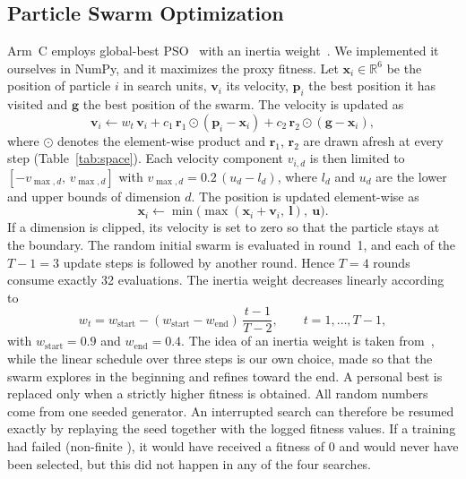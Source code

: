 \subsection{Particle Swarm Optimization}
\label{subsec:pso}

Arm~C employs global-best PSO~\cite{kennedy1995particle} with an inertia weight~\cite{shi1998modified}. We implemented it ourselves in NumPy, and it maximizes the proxy fitness. Let $\mathbf{x}_i \in \mathbb{R}^6$ be the position of particle $i$ in search units, $\mathbf{v}_i$ its velocity, $\mathbf{p}_i$ the best position it has visited and $\mathbf{g}$ the best position of the swarm. The velocity is updated as
\begin{equation}
\mathbf{v}_i \leftarrow w_t\,\mathbf{v}_i + c_1\,\mathbf{r}_1 \odot (\mathbf{p}_i - \mathbf{x}_i) + c_2\,\mathbf{r}_2 \odot (\mathbf{g} - \mathbf{x}_i),
\label{eq:velocity}
\end{equation}
where $\odot$ denotes the element-wise product and $\mathbf{r}_1$, $\mathbf{r}_2$ are drawn afresh at every step (Table~\ref{tab:space}). Each velocity component $v_{i,d}$ is then limited to $[-v_{\max,d},\, v_{\max,d}]$ with $v_{\max,d} = 0.2\,(u_d - l_d)$, where $l_d$ and $u_d$ are the lower and upper bounds of dimension $d$. The position is updated element-wise as
\begin{equation}
\mathbf{x}_i \leftarrow \min\bigl(\max(\mathbf{x}_i + \mathbf{v}_i,\ \mathbf{l}),\ \mathbf{u}\bigr).
\label{eq:position}
\end{equation}
If a dimension is clipped, its velocity is set to zero so that the particle stays at the boundary. The random initial swarm is evaluated in round~1, and each of the $T-1 = 3$ update steps is followed by another round. Hence $T = 4$ rounds consume exactly 32 evaluations. The inertia weight decreases linearly according to
\begin{equation}
w_t = w_{\mathrm{start}} - (w_{\mathrm{start}} - w_{\mathrm{end}})\,\frac{t-1}{T-2}, \qquad t = 1, \dots, T-1,
\label{eq:inertia}
\end{equation}
with $w_{\mathrm{start}} = 0.9$ and $w_{\mathrm{end}} = 0.4$. The idea of an inertia weight is taken from~\cite{shi1998modified}, while the linear schedule over three steps is our own choice, made so that the swarm explores in the beginning and refines toward the end. A personal best is replaced only when a strictly higher fitness is obtained. All random numbers come from one seeded generator. An interrupted search can therefore be resumed exactly by replaying the seed together with the logged fitness values. If a training had failed (non-finite \mapfifty), it would have received a fitness of 0 and would never have been selected, but this did not happen in any of the four searches.


